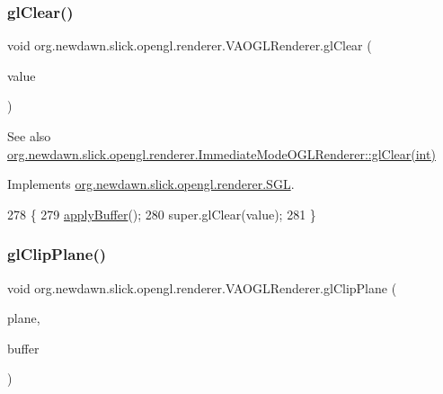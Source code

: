 \subsubsection{\texorpdfstring{gl\+Clear()}{glClear()}}
{\footnotesize\ttfamily void org.\+newdawn.\+slick.\+opengl.\+renderer.\+V\+A\+O\+G\+L\+Renderer.\+gl\+Clear (\begin{DoxyParamCaption}\item[{int}]{value }\end{DoxyParamCaption})\hspace{0.3cm}{\ttfamily [inline]}}

\begin{DoxySeeAlso}{See also}
\mbox{\hyperlink{classorg_1_1newdawn_1_1slick_1_1opengl_1_1renderer_1_1_immediate_mode_o_g_l_renderer_afc6e323939ac38f4f55f78cb02e5ad03}{org.\+newdawn.\+slick.\+opengl.\+renderer.\+Immediate\+Mode\+O\+G\+L\+Renderer\+::gl\+Clear(int)}} 
\end{DoxySeeAlso}


Implements \mbox{\hyperlink{interfaceorg_1_1newdawn_1_1slick_1_1opengl_1_1renderer_1_1_s_g_l_a254bdaa78a48f3fd3fd4ada15c910d4a}{org.\+newdawn.\+slick.\+opengl.\+renderer.\+S\+GL}}.


\begin{DoxyCode}
278                                    \{
279         \mbox{\hyperlink{classorg_1_1newdawn_1_1slick_1_1opengl_1_1renderer_1_1_v_a_o_g_l_renderer_a7c5d09419cd40761be8f849631aebab5}{applyBuffer}}();
280         super.glClear(value);
281     \}
\end{DoxyCode}
\mbox{\label{classorg_1_1newdawn_1_1slick_1_1opengl_1_1renderer_1_1_v_a_o_g_l_renderer_a0d0e37d7a7a2ff0ac6721d3136a3f110}} 
\subsubsection{\texorpdfstring{gl\+Clip\+Plane()}{glClipPlane()}}
{\footnotesize\ttfamily void org.\+newdawn.\+slick.\+opengl.\+renderer.\+V\+A\+O\+G\+L\+Renderer.\+gl\+Clip\+Plane (\begin{DoxyParamCaption}\item[{int}]{plane,  }\item[{Double\+Buffer}]{buffer }\end{DoxyParamCaption})\hspace{0.3cm}{\ttfamily [inline]}}

